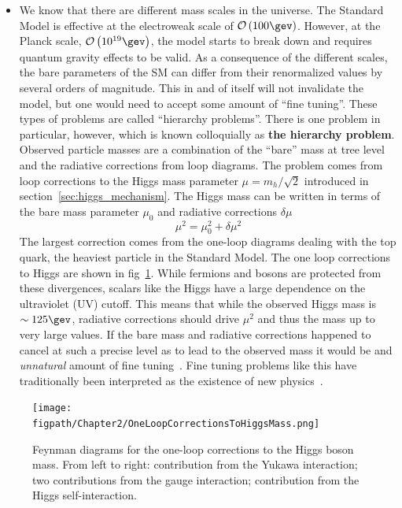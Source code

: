 \begin{itemize}
	\item We know that there are different mass scales in the universe. The Standard Model is effective at the electroweak scale of $\mathcal{O}\left(\mathrm{100}\gev\right)$. However, at the Planck scale, $\mathcal{O}\left(\mathrm{10^{19}}\gev\right)$, the model starts to break down and requires quantum gravity effects to be valid. As a consequence of the different scales, the bare parameters of the SM can differ from their renormalized values by several orders of magnitude. This in and of itself will not invalidate the model, but one would need to accept some amount of ``fine tuning''. These types of problems are called ``hierarchy problems''. There is one problem in particular, however, which is known colloquially as \textbf{the hierarchy problem}. Observed particle masses are a combination of the ``bare'' mass at tree level and the radiative corrections from loop diagrams. The problem comes from loop corrections to the Higgs mass parameter $\mu=m_{h}/\sqrt{2}$ introduced in section~\ref{sec:higgs_mechanism}. The Higgs mass can be written in terms of the bare mass parameter $\mu_{0}$ and radiative corrections $\delta\mu$
		\begin{equation}
			\mu^{2}=\mu_{0}^{2}+\delta\mu^{2}
		\end{equation}
	The largest correction comes from the one-loop diagrams dealing with the top quark, the heaviest particle in the Standard Model. The one loop corrections to Higgs are shown in fig~\ref{fig:one_loop_corrections_to_higgs_mass}. While fermions and bosons are protected from these divergences, scalars like the Higgs have a large dependence on the ultraviolet (UV) cutoff. This means that while the observed Higgs mass is $\sim\textrm{125}\gev$, radiative corrections should drive $\mu^{2}$ and thus the mass up to very large values. If the bare mass and radiative corrections happened to cancel at such a precise level as to lead to the observed mass it would be and \textit{unnatural} amount of fine tuning~\cite{SUSSKIND1984181}. Fine tuning problems like this have traditionally been interpreted as the existence of new physics~\cite{Morrissey20121}.
\end{itemize}
\begin{figure}[hbt]
    \centering
    \texttt{[image: \\figpath/Chapter2/OneLoopCorrectionsToHiggsMass.png]}
    \caption{Feynman diagrams for the one-loop corrections to the Higgs boson mass. From left to right: contribution from the Yukawa interaction; two contributions from the gauge interaction; contribution from the Higgs self-interaction.}
    \label{fig:one_loop_corrections_to_higgs_mass}
\end{figure}

